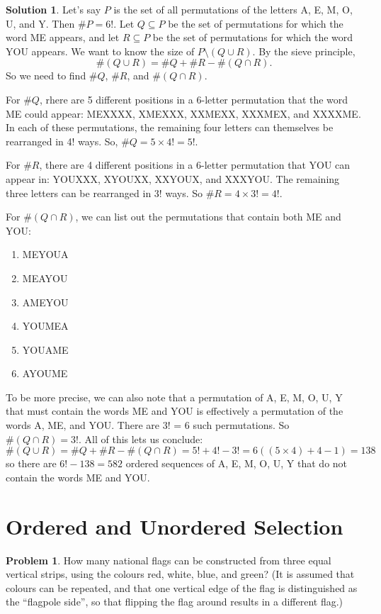 \documentclass{article}
\numberwithin{equation}{section}
\theoremstyle{plain}
\theoremstyle{definition}
\newtheorem{problem}{Problem}
\newtheorem*{solution*}{Solution}
\begin{document}
\begin{solution*}
	Let's say $P$ is the set of all permutations of the letters A, E, M, O, U, and Y. Then $\#P = 6!$. Let $Q \subseteq P$ be the set of permutations for which the word ME appears, and let $R \subseteq P$ be the set of permutations for which the word YOU appears. We want to know the size of $P \setminus(Q \cup R)$. By the sieve principle, $$\#(Q \cup R) = \#Q + \#R - \#(Q \cap R).$$ So we need to find $\#Q$, $\#R$, and $\#(Q \cap R)$. 
	
	For $\#Q$, rhere are 5 different positions in a 6-letter permutation that the word ME could appear: MEXXXX, XMEXXX, XXMEXX, XXXMEX, and XXXXME. In each of these permutations, the remaining four letters can themselves be rearranged in 4! ways. So, $\#Q = 5 \times 4! = 5!$. 
	
	For $\#R$, there are 4 different positions in a 6-letter permutation that YOU can appear in: YOUXXX, XYOUXX, XXYOUX, and XXXYOU. The remaining three letters can be rearranged in 3! ways. So $\#R = 4 \times 3! = 4!$. 
	
	For $\#(Q \cap R)$, we can list out the permutations that contain both ME and YOU: 
	\begin{enumerate}
		\item MEYOUA
		\item MEAYOU
		\item AMEYOU
		\item YOUMEA
		\item YOUAME
		\item AYOUME
	\end{enumerate}
	To be more precise, we can also note that a permutation of A, E, M, O, U, Y that must contain the words ME and YOU is effectively a permutation of the words A, ME, and YOU. There are 3! = 6 such permutations. So $\#(Q \cap R) = 3!$. All of this lets us conclude: 
	\[
	\#(Q \cup R) = \#Q + \#R - \#(Q \cap R) = 5! + 4! - 3! = 6((5 \times 4) + 4 - 1) = 138
	\]
	so there are $6! - 138 = \boxed{582}$ ordered sequences of A, E, M, O, U, Y that do not contain the words ME and YOU. 
\end{solution*}

\section*{Ordered and Unordered Selection}

\begin{problem}
	How many national flags can be constructed from three equal vertical strips, using the colours red, white, blue, and green? (It is assumed that colours can be repeated, and that one vertical edge of the flag is distinguished as the ``flagpole side'', so that flipping the flag around results in a different flag.)
\end{problem}
\end{document}

